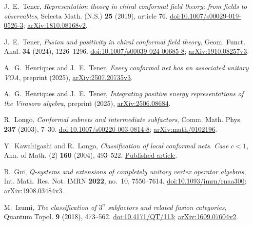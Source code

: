 
J.~E.~Tener,
\emph{Representation theory in chiral conformal field theory:
from fields to observables},
Selecta Math. (N.S.) \textbf{25} (2019), article 76.
\href{https://doi.org/10.1007/s00029-019-0526-3}{doi:10.1007/s00029-019-0526-3};
\href{https://arxiv.org/abs/1810.08168v2}{arXiv:1810.08168v2}.

J.~E.~Tener,
\emph{Fusion and positivity in chiral conformal field theory},
Geom. Funct. Anal. \textbf{34} (2024), 1226--1296.
\href{https://doi.org/10.1007/s00039-024-00685-8}{doi:10.1007/s00039-024-00685-8};
\href{https://arxiv.org/abs/1910.08257v3}{arXiv:1910.08257v3}.

A.~G.~Henriques and J.~E.~Tener,
\emph{Every conformal net has an associated unitary VOA},
preprint (2025),
\href{https://arxiv.org/abs/2507.20735v3}{arXiv:2507.20735v3}.

A.~G.~Henriques and J.~E.~Tener,
\emph{Integrating positive energy representations of the Virasoro algebra},
preprint (2025),
\href{https://arxiv.org/abs/2506.08684}{arXiv:2506.08684}.

R.~Longo,
\emph{Conformal subnets and intermediate subfactors},
Comm. Math. Phys. \textbf{237} (2003), 7--30.
\href{https://doi.org/10.1007/s00220-003-0814-8}{doi:10.1007/s00220-003-0814-8};
\href{https://arxiv.org/abs/math/0102196}{arXiv:math/0102196}.

Y.~Kawahigashi and R.~Longo,
\emph{Classification of local conformal nets. Case $c<1$},
Ann. of Math. (2) \textbf{160} (2004), 493--522.
\href{https://annals.math.princeton.edu/wp-content/uploads/annals-v160-n2-p04.pdf}{Published article}.

B.~Gui,
\emph{Q-systems and extensions of completely unitary vertex operator algebras},
Int. Math. Res. Not. IMRN \textbf{2022}, no.~10, 7550--7614.
\href{https://doi.org/10.1093/imrn/rnaa300}{doi:10.1093/imrn/rnaa300};
\href{https://arxiv.org/abs/1908.03484v3}{arXiv:1908.03484v3}.

M.~Izumi,
\emph{The classification of $3^n$ subfactors and related fusion categories},
Quantum Topol. \textbf{9} (2018), 473--562.
\href{https://doi.org/10.4171/QT/113}{doi:10.4171/QT/113};
\href{https://arxiv.org/abs/1609.07604v2}{arXiv:1609.07604v2}.

